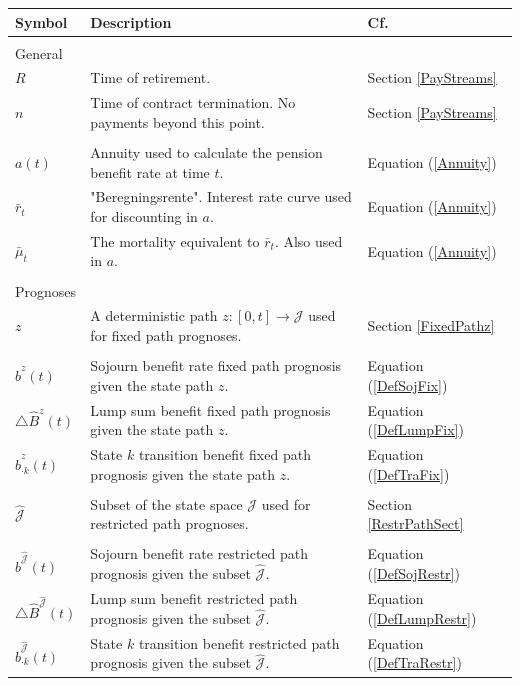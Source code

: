 \documentclass{article}
\newcommand{\1}[1]{\mathbbm{1}_{\left\lbrace #1 \right\rbrace}}
\theoremstyle{break}
\theoremstyle{remark}
\numberwithin{equation}{section}
\begin{document}
\begin{table}[H]
	\begin{tabular}{lll}
		\hline
		\textbf{Symbol}	& \textbf{Description} & \textbf{Cf.}  \\
		\hline
		&&\\
		General&&\\
		\hline
		$R$& Time of retirement. & Section \ref{PayStreams}\\
		$n$& Time of contract termination. No payments beyond this point. & Section \ref{PayStreams}\\
		&&\\
		$a(t)$	& Annuity used to calculate the pension benefit rate at time $t$. & Equation (\ref{Annuity}) \\
		$\bar{r}_t$	& "Beregningsrente". Interest rate curve used for discounting in $a$. & Equation (\ref{Annuity}) \\
		$\bar{\mu}_t$	& The mortality equivalent to $\bar{r}_t$. Also used in $a$.  & Equation (\ref{Annuity}) \\
		&&\\
		Prognoses&&\\
		\hline
		$z$	& A deterministic path $z: [0,t] \to \mathcal{J}$ used for fixed path prognoses. & Section \ref{FixedPathz} \\
		&&\\
		$\hat{b}^z(t)$ & Sojourn benefit rate fixed path prognosis given the state path $z$. & Equation (\ref{DefSojFix}) \\
		$ \triangle \hat{B}^z(t) $& Lump sum benefit fixed path prognosis given the state path $z$. & Equation (\ref{DefLumpFix}) \\
		$ \hat{b}_{\cdot k}^z(t) $& State $k$ transition benefit fixed path prognosis given the state path $z$. & Equation (\ref{DefTraFix}) \\
		&&\\
		$\hat{\mathcal{J}}$	& Subset of the state space $\mathcal{J}$ used for restricted path prognoses. & Section \ref{RestrPathSect} \\
		&&\\
		$\hat{b}^{\hat{\mathcal{J}}}(t)$ & Sojourn benefit rate restricted path prognosis given the subset $\hat{\mathcal{J}}$. & Equation (\ref{DefSojRestr}) \\
		$ \triangle \hat{B}^{\hat{\mathcal{J}}}(t) $& Lump sum benefit restricted path prognosis given the subset $\hat{\mathcal{J}}$. & Equation (\ref{DefLumpRestr}) \\
		$\hat{b}_{\cdot k}^{\hat{\mathcal{J}}}(t)$ & State $k$ transition benefit restricted path prognosis given the subset $\hat{\mathcal{J}}$. & Equation (\ref{DefTraRestr}) \\

\end{tabular}
\end{table}
\end{document}
